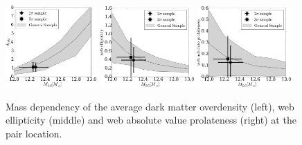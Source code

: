 \documentclass{emulateapj}
\begin{document}
\begin{figure}
\begin{center}
  \includegraphics[width=0.31\textwidth]{median_mass_overdensity.pdf} 
  \includegraphics[width=0.32\textwidth]{median_mass_ellipticity.pdf} 
  \includegraphics[width=0.32\textwidth]{median_mass_prolateness.pdf} 
\caption{Mass dependency of the average dark matter overdensity (left),
  web ellipticity (middle) and web absolute value prolateness (right) at the
  pair location.
\label{fig:median_overdensity}}
\end{center}
\end{figure}
\end{document}
